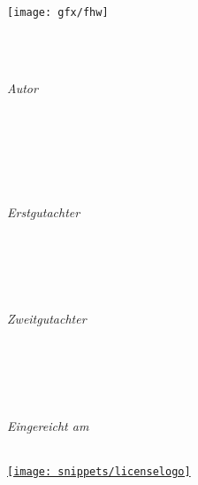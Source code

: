 \begin{titlepage}
	\tgherosfont
	\centering

	\texttt{[image: gfx/fhw]} \\

	\vfill
  \begin{minipage}[t]{.8\textwidth}
    \centering
    {\LARGE \color{ctcolortitle}\textbf{\thesisTitle} \\[10mm]}
	  {\Large \thesisSubtitle} \\
  \end{minipage}
	\vfill
	\begin{minipage}[t]{.27\textwidth}
		\raggedleft
		\textit{Autor}
	\end{minipage}
	\hspace*{15pt}
	\begin{minipage}[t]{.65\textwidth}
		{\Large \thesisAuthor} \\
	  	{\thesisAuthorStudentNumber} \\
	  	{\thesisAuthorEmail} \\
    \end{minipage} \\[5mm]
    \begin{minipage}[t]{.27\textwidth}
		\raggedleft
		\textit{Erstgutachter}
	\end{minipage}
	\hspace*{15pt}
	\begin{minipage}[t]{.65\textwidth}
		{\Large \thesisFirstReviewer} \\
	  	{\thesisFirstReviewerEmail} \\
	\end{minipage} \\[5mm]
	\begin{minipage}[t]{.27\textwidth}
		\raggedleft
		\textit{Zweitgutachter}
	\end{minipage}
	\hspace*{15pt}
	\begin{minipage}[t]{.65\textwidth}
		{\Large \thesisSecondReviewer} \\
	  	{\thesisSecondReviewerEmail} \\
	\end{minipage} \\[10mm]
	\begin{minipage}[t]{.27\textwidth}
		\raggedleft
		\textit{Eingereicht am}
	\end{minipage}
	\hspace*{15pt}
	\begin{minipage}[t]{.65\textwidth}
		\thesisDate
	\end{minipage} \\
	\vfill
	\centering \href{https://creativecommons.org/licenses/by-sa/4.0/}{\texttt{[image: snippets/licenselogo]}}
\end{titlepage}



